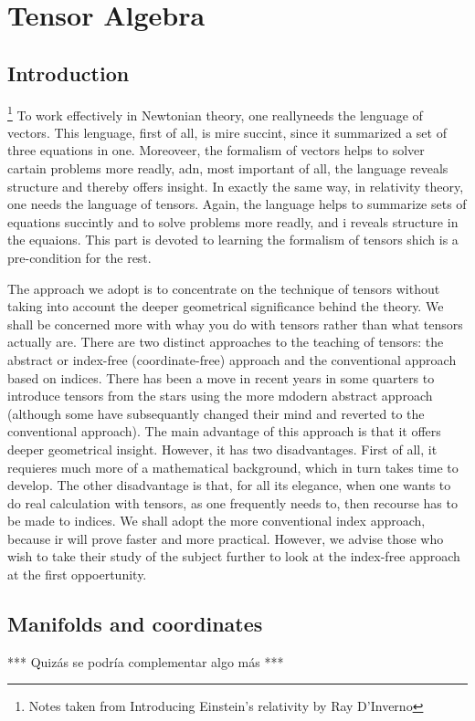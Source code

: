 \chapter{Tensor Algebra}
\section{Introduction}\footnote{Notes taken from Introducing Einstein's relativity by Ray D'Inverno}
To work effectively in Newtonian theory, one reallyneeds the lenguage of vectors. This lenguage, first of all, is mire succint, since it  summarized a set of three equations in one. Moreoveer, the formalism of vectors helps to solver cartain problems more readly, adn, most important of all, the language reveals structure and thereby offers insight. In exactly the same way, in relativity theory, one needs the language of tensors. Again, the language helps to summarize sets of equations succintly and to solve problems more readly, and i reveals structure in the equaions. This part is devoted to learning the formalism of tensors shich is a pre-condition for the rest.

The approach we adopt is to concentrate on the technique of tensors without taking into account the deeper geometrical significance behind the theory. We shall be concerned more with whay you do with tensors rather than what tensors actually are. There are two distinct approaches to the teaching of tensors: the abstract or index-free (coordinate-free) approach and the conventional approach based on indices. There has been a move in recent years in some quarters to introduce tensors from the stars using the more mdodern abstract approach (although some have subsequantly changed their mind and reverted to the conventional approach). The main advantage of this approach is that it offers deeper geometrical insight. However, it has two disadvantages. First of all, it requieres much more of a mathematical background, which in turn takes time to develop. The other disadvantage is that, for all its elegance, when one wants to do real calculation with tensors, as one frequently needs to, then recourse has to be made to indices. We shall adopt the more conventional index approach, because ir will prove faster and more practical. However, we advise those who wish to take their study of the subject further to look at the index-free approach at the first oppoertunity.

\section{Manifolds and coordinates}
*** Quizás se podría complementar algo más ***

